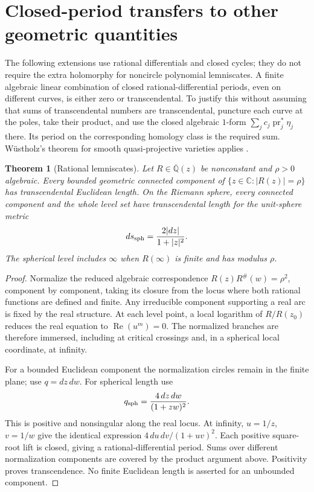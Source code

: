 \documentclass[11pt,a4paper]{article}
\newtheorem{theorem}{Theorem}[section]
\theoremstyle{definition}
\theoremstyle{remark}
\numberwithin{equation}{section}
\newcommand{\Qbar}{\overline{\mathbb Q}}
\begin{document}
\section{Closed-period transfers to other geometric quantities}
\label{lm-geometric-transfers}

The following extensions use rational differentials and closed cycles;
they do not require the extra holomorphy for noncircle polynomial
lemniscates.  A finite algebraic linear combination of closed
rational-differential periods, even on different curves, is either zero
or transcendental.  To justify this without assuming that sums of
transcendental numbers are transcendental, puncture each curve at the
poles, take their product, and use the closed algebraic $1$-form
$\sum_j c_j\operatorname{pr}_j^*\eta_j$ there.  Its period on the
corresponding homology class is the required sum.  W\"ustholz's theorem
for smooth quasi-projective varieties applies
\cite[Theorem~3.1]{lm-Braden}.

\begin{theorem}[Rational lemniscates]\label{lm-rational}
Let $R\in\Qbar(z)$ be nonconstant and $\rho>0$ algebraic.  Every bounded
geometric connected component of
$\{z\in\mathbb C:|R(z)|=\rho\}$ has transcendental Euclidean length.
On the Riemann sphere, every connected component and the whole level set
have transcendental length for the unit-sphere metric
\[
 ds_{\rm sph}=\frac{2|dz|}{1+|z|^2}.
\]
The spherical level includes $\infty$ when $R(\infty)$ is finite and
has modulus $\rho$.
\end{theorem}

\begin{proof}
Normalize the reduced algebraic correspondence
$R(z)R^\#(w)=\rho^2$, component by component, taking its closure from the
locus where both rational functions are defined and finite.  Any irreducible component
supporting a real arc is fixed by the real structure.  At each level
point, a local logarithm of $R/R(z_0)$ reduces the real equation to
$\operatorname{Re}(u^m)=0$.  The normalized branches are therefore
immersed, including at critical crossings and, in a spherical local
coordinate, at infinity.

For a bounded Euclidean component the normalization circles remain in
the finite plane; use $q=dz\,dw$.  For spherical length use
\[
 q_{\rm sph}=\frac{4\,dz\,dw}{(1+zw)^2}.
\]
This is positive and nonsingular along the real locus.  At infinity,
$u=1/z$, $v=1/w$ give the identical expression
$4\,du\,dv/(1+uv)^2$.  Each positive square-root lift is closed, giving
a rational-differential period.  Sums over different normalization
components are covered by the product argument above.  Positivity
proves transcendence.  No finite Euclidean length is asserted for an
unbounded component.
\end{proof}
\end{document}
